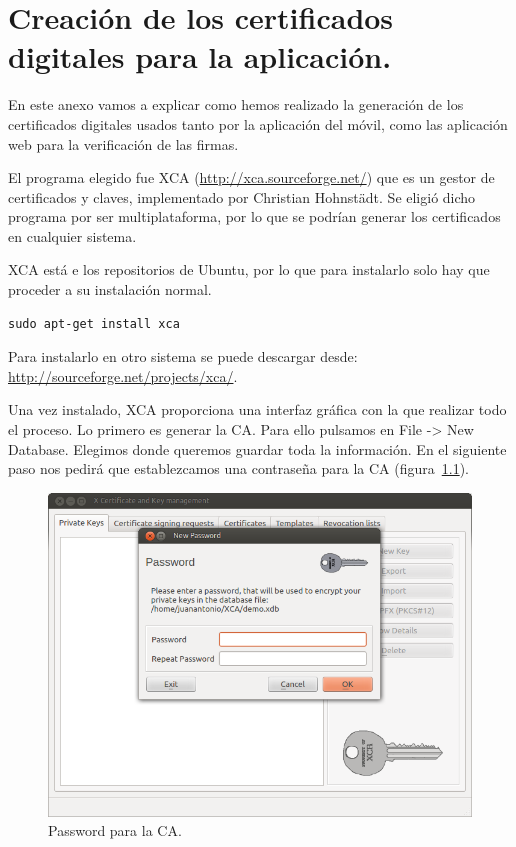 \chapter[Creación certificados digitales.]{Creación de los certificados digitales para la aplicación.}\label{cap:anexoB}

En este anexo vamos a explicar como hemos realizado la generación de los certificados digitales usados tanto por la aplicación del móvil, como las aplicación web para la verificación de las firmas.

El programa elegido fue XCA (\url{http://xca.sourceforge.net/}) que es un gestor de certificados y claves, implementado por Christian Hohnstädt. Se eligió dicho programa por ser multiplataforma, por lo que se podrían generar los certificados en cualquier sistema.

XCA está e los repositorios de Ubuntu, por lo que para instalarlo solo hay que proceder a su instalación normal. 

\begin{lstlisting}[style=consola]
sudo apt-get install xca
\end{lstlisting}

Para instalarlo en otro sistema se puede descargar desde: \url{http://sourceforge.net/projects/xca/}.

Una vez instalado, XCA proporciona una interfaz gráfica con la que realizar todo el proceso. Lo primero es generar la CA. Para ello pulsamos en File -> New Database. Elegimos donde queremos guardar toda la información. En el siguiente paso nos pedirá que establezcamos una contraseña para la CA (figura~\ref{fig:password}).

\begin{figure}
  \centering
    \includegraphics[scale=0.6]{./AnexoCreacionCertificado/imagenes/password.png}
  \caption{Password para la CA.}
  \label{fig:password}
\end{figure}

